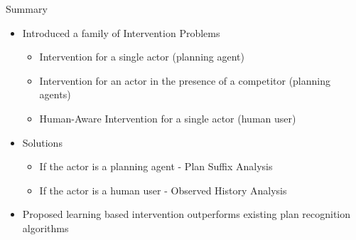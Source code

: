 \begin{frame}{Summary}
\begin{itemize}
\item Introduced a family of Intervention Problems
\begin{itemize}
\item Intervention for a single actor (planning agent)
\item Intervention for an actor in the presence of a competitor (planning agents)
\item Human-Aware Intervention for a single actor (human user)
\end{itemize}
\item Solutions
\begin{itemize}
\item If the actor is a planning agent - Plan Suffix Analysis
\item If the actor is a human user -  Observed History Analysis
\end{itemize}
\item Proposed learning based intervention outperforms existing plan recognition algorithms
\end{itemize}
\end{frame}